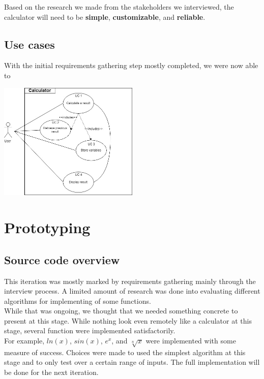 \documentclass[a4paper]{article}
\begin{document}
Based on the research we made from the stakeholders we interviewed, the calculator will need to be \textbf{simple}, \textbf{customizable}, and \textbf{reliable}.

\subsection{Use cases}

With the initial requirements gathering step mostly completed, we were now able to 

\begin{center}
\includegraphics[width=0.5\textwidth]{UseCaseDiagram.jpg}
\end{center}

\section{Prototyping}

\subsection{Source code overview}

This iteration was mostly marked by requirements gathering mainly through the interview process. A limited amount of research was done into evaluating different algorithms for implementing of some functions. \\

While that was ongoing, we thought that we needed something concrete to present at this stage. While nothing look even remotely like a calculator at this stage, several function were implemented satisfactorily. \\

For example, $ln(x)$, $sin(x)$, $e^x$, and $\sqrt[n]{x}$ were implemented with some measure of success. Choices were made to used the simplest algorithm at this stage and to only test over a certain range of inputs. The full implementation will be done for the next iteration. \\
\end{document}
